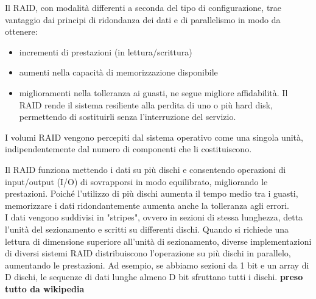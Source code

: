 
Il RAID, con modalit\`{a} differenti a seconda del tipo di configurazione, trae vantaggio dai principi di ridondanza dei dati e di parallelismo in modo da ottenere:
\begin{itemize}
\item 
incrementi di prestazioni (in lettura/scrittura)
\item
aumenti nella capacit\`{a} di memorizzazione disponibile
\item 
miglioramenti nella tolleranza ai guasti, ne segue migliore affidabilit\`{a}\cite{etichetta10}. Il RAID rende il sistema resiliente alla perdita di uno o pi\`{u} hard disk, permettendo di sostituirli senza l'interruzione del servizio.
\end{itemize}

I volumi RAID vengono percepiti dal sistema operativo come una singola unit\`{a}, indipendentemente dal numero di componenti che li costituiscono.

Il RAID funziona mettendo i dati su pi\`{u} dischi e consentendo operazioni di input/output (I/O) di sovrapporsi in modo equilibrato, migliorando le prestazioni. Poich\'{e} l'utilizzo di pi\`{u} dischi aumenta il tempo medio tra i guasti, memorizzare i dati ridondantemente aumenta anche la tolleranza agli errori.\\

I dati vengono suddivisi in "stripes", ovvero in sezioni di stessa  lunghezza, detta l'unit\`{a} del sezionamento e scritti su differenti dischi. Quando si richiede una lettura di dimensione superiore all'unit\`{a} di sezionamento, diverse implementazioni di diversi sistemi RAID distribuiscono l'operazione su pi\`{u} dischi in parallelo, aumentando le prestazioni. Ad esempio, se abbiamo sezioni da 1 bit e un array di D dischi, le sequenze di dati lunghe almeno D bit sfruttano tutti i dischi. \textbf{preso tutto da wikipedia}


